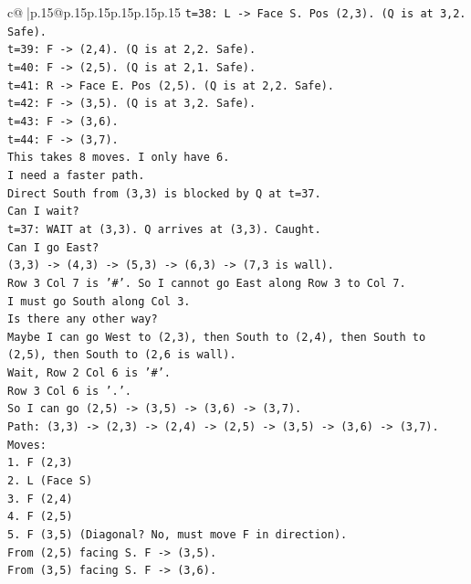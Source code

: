 \documentclass{article}
\begin{document}
{\begin{supertabular}{c@{$\;$}|p{.15\linewidth}@{}p{.15\linewidth}p{.15\linewidth}p{.15\linewidth}p{.15\linewidth}p{.15\linewidth}}
{{{\texttt{t=38: L {-}> Face S. Pos (2,3). (Q is at 3,2. Safe).} \\
\texttt{t=39: F {-}> (2,4). (Q is at 2,2. Safe).} \\
\texttt{t=40: F {-}> (2,5). (Q is at 2,1. Safe).} \\
\texttt{t=41: R {-}> Face E. Pos (2,5). (Q is at 2,2. Safe).} \\
\texttt{t=42: F {-}> (3,5). (Q is at 3,2. Safe).} \\
\texttt{t=43: F {-}> (3,6).} \\
\texttt{t=44: F {-}> (3,7).} \\
\texttt{This takes 8 moves. I only have 6.} \\
\texttt{I need a faster path.} \\
\texttt{Direct South from (3,3) is blocked by Q at t=37.} \\
\texttt{Can I wait?} \\
\texttt{t=37: WAIT at (3,3). Q arrives at (3,3). Caught.} \\
\texttt{Can I go East?} \\
\texttt{(3,3) {-}> (4,3) {-}> (5,3) {-}> (6,3) {-}> (7,3 is wall).} \\
\texttt{Row 3 Col 7 is '\#'. So I cannot go East along Row 3 to Col 7.} \\
\texttt{I must go South along Col 3.} \\
\texttt{Is there any other way?} \\
\texttt{Maybe I can go West to (2,3), then South to (2,4), then South to (2,5), then South to (2,6 is wall).} \\
\texttt{Wait, Row 2 Col 6 is '\#'.} \\
\texttt{Row 3 Col 6 is '.'.} \\
\texttt{So I can go (2,5) {-}> (3,5) {-}> (3,6) {-}> (3,7).} \\
\texttt{Path: (3,3) {-}> (2,3) {-}> (2,4) {-}> (2,5) {-}> (3,5) {-}> (3,6) {-}> (3,7).} \\
\texttt{Moves:} \\
\texttt{1. F (2,3)} \\
\texttt{2. L (Face S)} \\
\texttt{3. F (2,4)} \\
\texttt{4. F (2,5)} \\
\texttt{5. F (3,5) (Diagonal? No, must move F in direction).} \\
\texttt{From (2,5) facing S. F {-}> (3,5).} \\
\texttt{From (3,5) facing S. F {-}> (3,6).} \\
}}}
\end{supertabular}}
\end{document}
